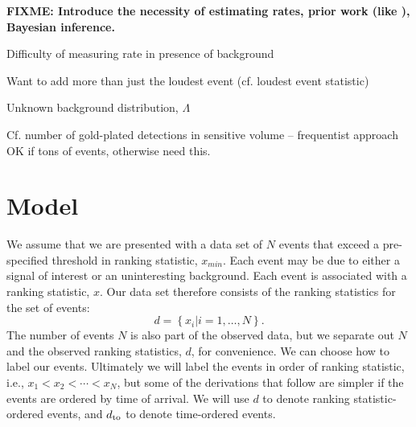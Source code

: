 \documentclass[aps,prd]{revtex4-1}
\newcommand{\fixme}[1]{\textbf{FIXME: #1}}
\newcommand{\mathset}[1]{\left\{ #1 \right\}}
\begin{document}
\fixme{Introduce the necessity of estimating rates, prior work (like
  \cite{Biswas2009}), Bayesian inference.}
  
Difficulty of measuring rate in presence of background

Want to add more than just the loudest event (cf. loudest event
statistic)

Unknown background distribution, $\Lambda$

Cf. number of gold-plated detections in sensitive volume --
frequentist approach OK if tons of events, otherwise need this.


\section{Model}

We assume that we are presented with a data set of $N$ events that
exceed a pre-specified threshold in ranking statistic, $x_{min}$.
Each event may be due to either a signal of interest or an
uninteresting background.  Each event is associated with a ranking
statistic, $x$.  Our data set therefore consists of the ranking
statistics for the set of events:
\begin{equation}
  d = \mathset{ x_i | i = 1, \ldots, N } .
\end{equation}
The number of events $N$ is also part of the observed data, but we
separate out $N$ and the observed ranking statistics, $d$, for
convenience. We can choose how to label our events. Ultimately we will
label the events in order of ranking statistic, i.e., $x_1 < x_2 <
\cdots < x_N$, but some of the derivations that follow are simpler if
the events are ordered by time of arrival. We will use $d$ to denote
ranking statistic-ordered events, and $d_{\rm to}$ to denote
time-ordered events.
\end{document}
